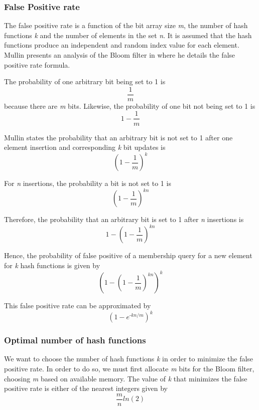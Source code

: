 \subsubsection*{False Positive rate}
The false positive rate is a function of the bit array size \textit{m}, the number of hash functions \textit{k} and the number of elements in the set \textit{n}. It is assumed that the hash functions produce an independent and random index value for each element. Mullin presents an analysis of the Bloom filter in \cite{Mullin-Bloom-Analysis} where he details the false positive rate formula. 

The probability of one arbitrary bit being set to 1 is
\begin{equation}
    \frac{1}{m}
\end{equation}
because there are \textit{m} bits. Likewise, the probability of one bit not being set to 1 is
\begin{equation}
    1-\frac{1}{m}
\end{equation}

Mullin states the probability that an arbitrary bit is not set to 1 after one element insertion and corresponding \textit{k} bit updates is
\begin{equation}
    (1-\frac{1}{m})^\textit{k}
\end{equation}

For \textit{n} insertions, the probability a bit is not set to 1 is
\begin{equation}
    (1-\frac{1}{m})^\textit{kn}
\end{equation}

Therefore, the probability that an arbitrary bit is set to 1 after \textit{n} insertions is 
\begin{equation}
    1-(1-\frac{1}{m})^\textit{kn}
\end{equation}

Hence, the probability of false positive of a membership query for a new element for \textit{k} hash functions is given by
\begin{equation}
    (1-(1-\frac{1}{m})^\textit{kn})^\textit{k}
\end{equation}

This false positive rate can be approximated by 
\begin{equation}
    (1-e^\textit{-kn/m})^\textit{k}
\end{equation}


\subsubsection*{Optimal number of hash functions}
We want to choose the number of hash functions \textit{k} in order to minimize the false positive rate. In order to do so, we must first allocate \textit{m} bits for the Bloom filter, choosing \textit{m} based on available memory. The value of \textit{k} that minimizes the false positive rate is either of the nearest integers given by
\begin{equation}
    \frac{m}{n}ln(2)
\end{equation}

